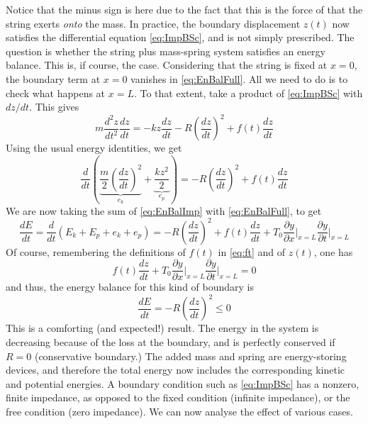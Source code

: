 Notice that the minus sign is here due to the fact that this is the force of that the string exerts \emph{onto} the mass. In practice, the boundary displacement $z(t)$ now satisfies the differential equation \eqref{eq:ImpBSc}, and is not simply prescribed. The question is whether the string plus mass-spring system satisfies an energy balance. This is, if course, the case. Considering that the string is fixed at $x=0$, the boundary term at $x=0$ vanishes in \eqref{eq:EnBalFull}. All we need to do is to check what happens at $x=L$. To that extent, take a product of \eqref{eq:ImpBSc} with $dz/dt$. This gives
\begin{equation}
m \frac{d^2 z}{dt^2}\frac{d z}{dt} = - k z\frac{d z}{dt} - R \left(\frac{d z}{dt}\right)^2 + f(t)\frac{d z}{dt}
\end{equation}
Using the usual energy identities, we get
\begin{equation}
\frac{d}{dt}\left( \underbrace{\frac{m}{2} \left(\frac{d z}{dt}\right)^2}_{e_k} + \underbrace{\frac{k z^2}{2}}_{e_p} \right) = - R \left(\frac{d z}{dt}\right)^2 + f(t)\frac{d z}{dt}
\end{equation}
We are now taking the sum of \eqref{eq:EnBalImp} with  \eqref{eq:EnBalFull}, to get
\begin{equation}
\frac{dE}{dt} = \frac{d}{dt}\left(E_k + E_p + e_k + e_p \right) = - R \left(\frac{d z}{dt}\right)^2 + f(t)\frac{d z}{dt} + T_0 \frac{\partial y}{\partial x}\Bigg|_{x=L} \frac{\partial y}{\partial t} \Bigg|_{x=L}
\end{equation}
Of course, remembering the definitions of $f(t)$ in \eqref{eq:ft} and of $z(t)$, one has 
\begin{equation}
f(t)\frac{d z}{dt} + T_0 \frac{\partial y}{\partial x}\Bigg|_{x=L} \frac{\partial y}{\partial t} \Bigg|_{x=L} = 0
\end{equation}
and thus, the energy balance for this kind of boundary is
\begin{equation}\label{eq:EnBalImp}
\frac{dE}{dt} = - R \left(\frac{d z}{dt}\right)^2 \leq 0
\end{equation}
This is a comforting (and expected!) result. The energy in the system is decreasing because of the loss at the boundary, and is perfectly conserved if $R=0$ (conservative boundary.) The added mass and spring are energy-storing devices, and therefore the total energy now includes the corresponding kinetic and potential energies. A boundary condition such as \eqref{eq:ImpBSc} has a nonzero, finite impedance, as opposed to the fixed condition (infinite impedance), or the free condition (zero impedance). We can now analyse the effect of various cases.


